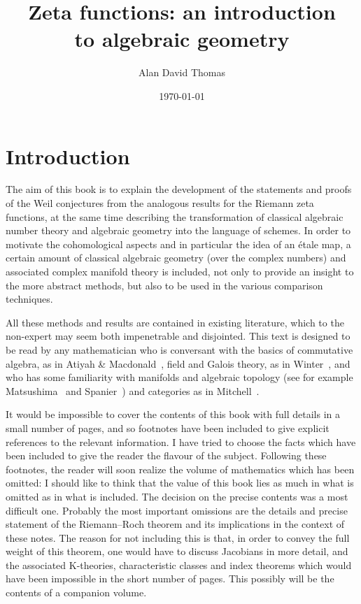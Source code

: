 \documentclass[10pt,leqno]{article}
\author{Alan David Thomas}
\date{\today}
\title{Zeta functions: an introduction\\to algebraic geometry}
\theoremstyle{definition}
\begin{document}
\maketitle


\section*{Introduction}

The aim of this book is to explain the development of the statements and proofs of the Weil conjectures from the analogous results for the Riemann zeta functions, at the same time describing the transformation of classical algebraic number theory and algebraic geometry into the language of schemes.
In order to motivate the cohomological aspects and in particular the idea of an \'etale map, a certain amount of classical algebraic geometry (over the complex numbers) and associated complex manifold theory is included, not only to provide an insight to the more abstract methods, but also to be used in the various comparison techniques.

All these methods and results are contained in existing literature, which to the non-expert may seem both impenetrable and disjointed.
This text is designed to be read by any mathematician who is conversant with the basics of commutative algebra, as in Atiyah \& Macdonald~\cite{bib:17}, field and Galois theory, as in Winter~\cite{bib:217}, and who has some familiarity with manifolds and algebraic topology (see for example Matsushima~\cite{bib:138} and Spanier~\cite{bib:183}) and categories as in Mitchell~\cite{bib:141}.

It would be impossible to cover the contents of this book with full details in a small number of pages, and so footnotes have been included to give explicit references to the relevant information.
I have tried to choose the facts which have been included to give the reader the flavour of the subject.
Following these footnotes, the reader will soon realize the volume of mathematics which has been omitted:
I should like to think that the value of this book lies as much in what is omitted as in what is included.
The decision on the precise contents was a most difficult one.
Probably the most important omissions are the details and precise statement of the Riemann--Roch theorem and its implications in the context of these notes.
The reason for not including this is that, in order to convey the full weight of this theorem, one would have to discuss Jacobians in more detail, and the associated K-theories, characteristic classes and index theorems which would have been impossible in the short number of pages.
This possibly will be the contents of a companion volume.
\end{document}
